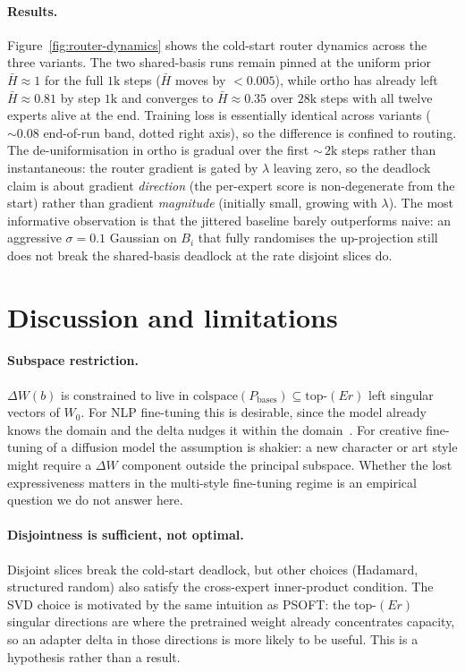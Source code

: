 \documentclass[10pt]{article}
\newcommand{\Pbases}{P_{\mathrm{bases}}}
\begin{document}
\paragraph{Results.}
Figure~\ref{fig:router-dynamics} shows the cold-start router dynamics
across the three variants. The two shared-basis runs remain pinned at
the uniform prior $\bar H\!\approx\!1$ for the full $1\text{k}$ steps
($\bar H$ moves by $<\!0.005$), while
ortho has already left $\bar H\!\approx\!0.81$ by step $1\text{k}$
and converges to $\bar H\!\approx\!0.35$ over $28\text{k}$ steps with
all twelve experts alive at the end. Training loss is essentially
identical across variants ($\sim\!0.08$ end-of-run band, dotted right
axis), so the difference is confined to routing. The de-uniformisation
in ortho is gradual over the first ${\sim}\,2\text{k}$ steps rather
than instantaneous: the router gradient is gated by $\lambda$ leaving
zero, so the deadlock claim is about gradient \emph{direction} (the
per-expert score is non-degenerate from the start) rather than
gradient \emph{magnitude} (initially small, growing with $\lambda$).
The most informative observation is that the jittered baseline barely
outperforms naive: an aggressive $\sigma\!=\!0.1$ Gaussian on $B_i$
that fully randomises the up-projection still does not break the
shared-basis deadlock at the rate disjoint slices do.

\section{Discussion and limitations}
\label{sec:discussion}

\paragraph{Subspace restriction.}
$\Delta W(b)$ is constrained to live in $\mathrm{colspace}(\Pbases)
\subseteq \mathrm{top}\text{-}(Er)$ left singular vectors of $W_0$.
For NLP fine-tuning this is desirable, since the model already knows
the domain and the delta nudges it within the
domain~\cite{wu2026psoft}. For creative fine-tuning of a diffusion
model the assumption is shakier: a new character or art style might
require a $\Delta W$ component outside the principal subspace. Whether
the lost expressiveness matters in the multi-style fine-tuning regime
is an empirical question we do not answer here.

\paragraph{Disjointness is sufficient, not optimal.}
Disjoint slices break the cold-start deadlock, but other choices
(Hadamard, structured random) also satisfy the cross-expert
inner-product condition. The SVD choice is motivated by the same
intuition as PSOFT: the top-$(Er)$ singular directions are where the
pretrained weight already concentrates capacity, so an adapter delta
in those directions is more likely to be useful. This is a hypothesis
rather than a result.
\end{document}
